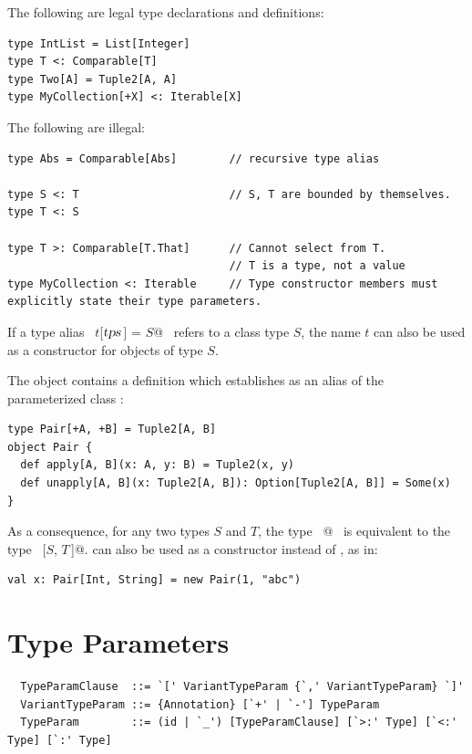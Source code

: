 \example The following are legal type declarations and definitions:
\begin{lstlisting}
type IntList = List[Integer]
type T <: Comparable[T]
type Two[A] = Tuple2[A, A]
type MyCollection[+X] <: Iterable[X]
\end{lstlisting}

The following are illegal:
\begin{lstlisting}
type Abs = Comparable[Abs]        // recursive type alias

type S <: T                       // S, T are bounded by themselves.
type T <: S

type T >: Comparable[T.That]      // Cannot select from T.
                                  // T is a type, not a value
type MyCollection <: Iterable     // Type constructor members must explicitly state their type parameters.
\end{lstlisting}

If a type alias ~\lstinline@type $t$[$\mbox{\sl tps}\,$] = $S$@~ refers to a class type
$S$, the name $t$ can also be used as a constructor for
objects of type $S$.

\example The  object contains a definition which establishes  
as an alias of the parameterized class :
\begin{lstlisting}
type Pair[+A, +B] = Tuple2[A, B] 
object Pair {
  def apply[A, B](x: A, y: B) = Tuple2(x, y)
  def unapply[A, B](x: Tuple2[A, B]): Option[Tuple2[A, B]] = Some(x)
}
\end{lstlisting}
As a consequence, for any two types $S$ and $T$, the type
~\lstinline@Pair[$S$, $T\,$]@~ is equivalent to the type ~[$S$, $T\,$]@.
 can also be used as a constructor instead of , as in:
\begin{lstlisting}
val x: Pair[Int, String] = new Pair(1, "abc")
\end{lstlisting}

\section{Type Parameters}\label{sec:type-params}

\syntax\begin{lstlisting}
  TypeParamClause  ::= `[' VariantTypeParam {`,' VariantTypeParam} `]'
  VariantTypeParam ::= {Annotation} [`+' | `-'] TypeParam
  TypeParam        ::= (id | `_') [TypeParamClause] [`>:' Type] [`<:' Type] [`:' Type]
\end{lstlisting}

